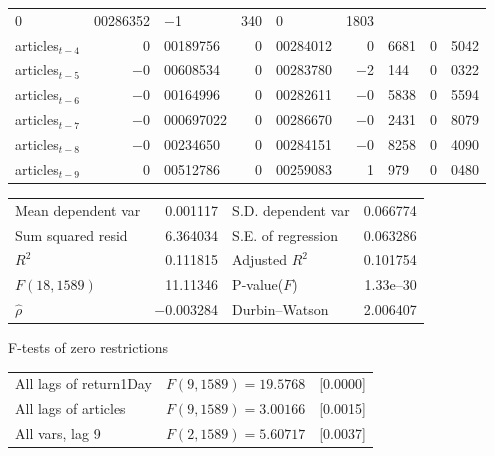 \begin{center}
\begin{longtable}{lr@{.}lr@{.}lr@{.}lr@{.}l}
    0&00286352 &
        $-$1&340 &
        0&1803 \\
articles$_{t-4}$ &
    0&00189756 &
    0&00284012 &
        0&6681 &
        0&5042 \\
articles$_{t-5}$ &
    $-$0&00608534 &
    0&00283780 &
        $-$2&144 &
        0&0322 \\
articles$_{t-6}$ &
    $-$0&00164996 &
    0&00282611 &
        $-$0&5838 &
        0&5594 \\
articles$_{t-7}$ &
    $-$0&000697022 &
    0&00286670 &
        $-$0&2431 &
        0&8079 \\
articles$_{t-8}$ &
    $-$0&00234650 &
    0&00284151 &
        $-$0&8258 &
        0&4090 \\
articles$_{t-9}$ &
    0&00512786 &
    0&00259083 &
        1&979 &
        0&0480 \\
\end{longtable}

\begin{tabular}{lrlr}
Mean dependent var &  0.001117 & S.D. dependent var &  0.066774 \\
Sum squared resid &  6.364034 & S.E. of regression &  0.063286 \\
$R^2$ &  0.111815 & Adjusted $R^2$ &  0.101754 \\
$F(18, 1589)$ &  11.11346 & P-value($F$) &  1.33\textrm{e--30} \\
$\hat{\rho}$ & $-$0.003284 & Durbin--Watson &  2.006407 \\
\end{tabular}

\end{center}

\begin{center}
F-tests of zero restrictions\\[1em]
\begin{tabular}{lll}
All lags of return1Day & $F(9, 1589) = 19.5768$ & [0.0000]\\
All lags of articles & $F(9, 1589) = 3.00166$ & [0.0015]\\
All vars, lag 9 & $F(2, 1589) = 5.60717$ & [0.0037]\\
\end{tabular}
\end{center}

